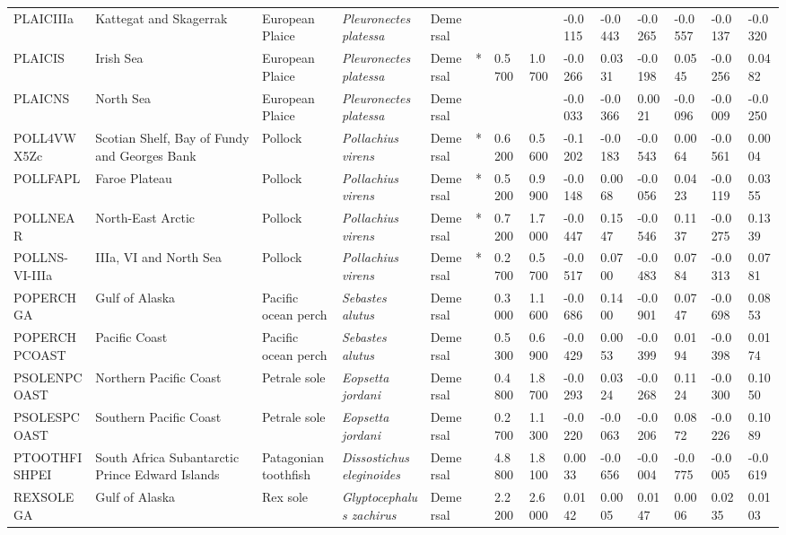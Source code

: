 \begin{longtable}{p{2.8cm}p{2cm}p{1.7cm}p{1.7cm}p{1cm}p{0.3cm}p{1cm}p{1cm}p{1cm}p{1cm}p{1cm}p{1cm}p{1cm}p{1cm}}
  PLAICIIIa & Kattegat and Skagerrak & European Plaice & \textit{Pleuronectes platessa} & Demersal &  &  &  & -0.0115 & -0.0443 & -0.0265 & -0.0557 & -0.0137 & -0.0320 \\ 
  PLAICIS & Irish Sea & European Plaice & \textit{Pleuronectes platessa} & Demersal & * & 0.5700 & 1.0700 & -0.0266 & 0.0331 & -0.0198 & 0.0545 & -0.0256 & 0.0482 \\ 
  PLAICNS & North Sea & European Plaice & \textit{Pleuronectes platessa} & Demersal &  &  &  & -0.0033 & -0.0366 & 0.0021 & -0.0096 & -0.0009 & -0.0250 \\ 
  POLL4VWX5Zc & Scotian Shelf, Bay of Fundy and Georges Bank & Pollock & \textit{Pollachius virens} & Demersal & * & 0.6200 & 0.5600 & -0.1202 & -0.0183 & -0.0543 & 0.0064 & -0.0561 & 0.0004 \\ 
  POLLFAPL & Faroe Plateau & Pollock & \textit{Pollachius virens} & Demersal & * & 0.5200 & 0.9900 & -0.0148 & 0.0068 & -0.0056 & 0.0423 & -0.0119 & 0.0355 \\ 
  POLLNEAR & North-East Arctic & Pollock & \textit{Pollachius virens} & Demersal & * & 0.7200 & 1.7000 & -0.0447 & 0.1547 & -0.0546 & 0.1137 & -0.0275 & 0.1339 \\ 
  POLLNS-VI-IIIa & IIIa, VI and North Sea & Pollock & \textit{Pollachius virens} & Demersal & * & 0.2700 & 0.5700 & -0.0517 & 0.0700 & -0.0483 & 0.0784 & -0.0313 & 0.0781 \\ 
  POPERCHGA & Gulf of Alaska & Pacific ocean perch & \textit{Sebastes alutus} & Demersal &   & 0.3000 & 1.1600 & -0.0686 & 0.1400 & -0.0901 & 0.0747 & -0.0698 & 0.0853 \\ 
  POPERCHPCOAST & Pacific Coast & Pacific ocean perch & \textit{Sebastes alutus} & Demersal &   & 0.5300 & 0.6900 & -0.0429 & 0.0053 & -0.0399 & 0.0194 & -0.0398 & 0.0174 \\ 
  PSOLENPCOAST & Northern Pacific Coast & Petrale sole & \textit{Eopsetta jordani} & Demersal &   & 0.4800 & 1.8700 & -0.0293 & 0.0324 & -0.0268 & 0.1124 & -0.0300 & 0.1050 \\ 
  PSOLESPCOAST & Southern Pacific Coast & Petrale sole & \textit{Eopsetta jordani} & Demersal &   & 0.2700 & 1.1300 & -0.0220 & -0.0063 & -0.0206 & 0.0872 & -0.0226 & 0.1089 \\ 
  PTOOTHFISHPEI & South Africa Subantarctic Prince Edward Islands & Patagonian toothfish & \textit{Dissostichus eleginoides} & Demersal &   & 4.8800 & 1.8100 & 0.0033 & -0.0656 & -0.0004 & -0.0775 & -0.0005 & -0.0619 \\ 
  REXSOLEGA & Gulf of Alaska & Rex sole & \textit{Glyptocephalus zachirus} & Demersal &   & 2.2200 & 2.6000 & 0.0142 & 0.0005 & 0.0147 & 0.0006 & 0.0235 & 0.0103 \\ 

\end{longtable}
